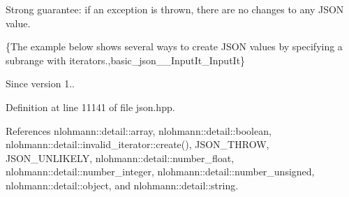 Strong guarantee\+: if an exception is thrown, there are no changes to any J\+S\+ON value.

\{The example below shows several ways to create J\+S\+ON values by specifying a subrange with iterators.,basic\+\_\+json\+\_\+\+\_\+\+Input\+It\+\_\+\+Input\+It\}

\begin{DoxySince}{Since}
version 1.. 
\end{DoxySince}


Definition at line 11141 of file json.\+hpp.



References nlohmann\+::detail\+::array, nlohmann\+::detail\+::boolean, nlohmann\+::detail\+::invalid\+\_\+iterator\+::create(), J\+S\+O\+N\+\_\+\+T\+H\+R\+OW, J\+S\+O\+N\+\_\+\+U\+N\+L\+I\+K\+E\+LY, nlohmann\+::detail\+::number\+\_\+float, nlohmann\+::detail\+::number\+\_\+integer, nlohmann\+::detail\+::number\+\_\+unsigned, nlohmann\+::detail\+::object, and nlohmann\+::detail\+::string.


